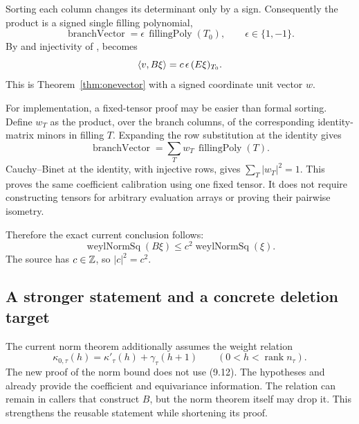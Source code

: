 Sorting each column changes its determinant only by a sign. Consequently
the product is a signed single filling polynomial,
\begin{equation}
 \operatorname{branchVector}=\epsilon\,\operatorname{fillingPoly}(T_0),
 \qquad \epsilon\in\{1,-1\}.
\end{equation}
By
and injectivity of ,  becomes
\begin{equation}
 \left\langle v,B\xi\right\rangle=c\,\epsilon\,(E\xi)_{T_0}.
\end{equation}
This is Theorem~\ref{thm:onevector} with a signed coordinate unit vector \(w\).

For implementation, a fixed-tensor proof may be easier than formal sorting.
Define \(w_T\) as the product, over the branch columns, of the corresponding
identity-matrix minors in filling \(T\). Expanding the row substitution
at the identity gives
\begin{equation}
 \operatorname{branchVector}
     =\sum_T w_T\,\operatorname{fillingPoly}(T).
\end{equation}
Cauchy--Binet at the identity, with injective rows, gives
\(\sum_T|w_T|^2=1\).
This proves the same coefficient calibration using one fixed tensor.
It does not require constructing tensors for arbitrary evaluation arrays
or proving their pairwise isometry.

Therefore the exact current conclusion follows:
\begin{equation}
 \boxed{\ 
 \operatorname{weylNormSq}(B\xi)
     \le c^2\operatorname{weylNormSq}(\xi).\ }
\end{equation}
The source has \(c\in\mathbb Z\), so \(|c|^2=c^2\).

\subsection{A stronger statement and a concrete deletion target}

The current norm theorem additionally assumes the weight relation
\begin{equation}
 \kappa_{0,\tau}(h)=\kappa'_\tau(h)+\gamma_\tau(h+1)
 \qquad(0<h<\operatorname{rank}n_\tau).
\end{equation}
The new proof of the norm bound does not use (9.12).
The hypotheses  and  already provide the
coefficient and equivariance information. The relation can remain
in callers that construct \(B\), but the norm theorem itself may drop it.
This strengthens the reusable statement while shortening its proof.

